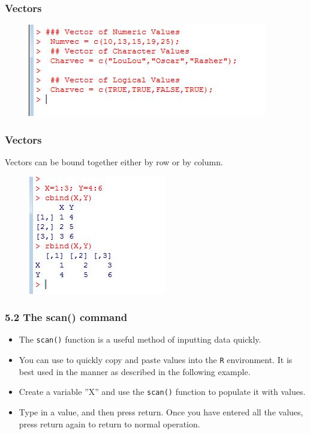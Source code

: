 \documentclass{beamer}
\begin{document}
 	\begin{frame}
 		\frametitle{Vectors}
 		\begin{figure}
 			\centering
 			\includegraphics[width=0.7\linewidth]{images/makevectors}
 			\caption{}
 			\label{fig:makevectors}
 		\end{figure}
 		
 	\end{frame}
 	\begin{frame}
 		\frametitle{Vectors} 
 		Vectors can be bound together either by row or by column.
 		\begin{figure}
 			\centering
 			\includegraphics[width=0.7\linewidth]{images/cbindrbind}
 		\end{figure}
 		
 	\end{frame}
 	\begin{frame}
 		\frametitle{5.2 The scan() command}
 		\begin{itemize}
 			\item The \texttt{scan()} function is a useful method of inputting data quickly. 
 			\item You can use to quickly copy
 			and paste values into the \texttt{R} environment. It is best used in the manner as described in the
 			following example. 
 			\item Create a variable ”X” and use the \texttt{scan()} function to populate it with
 			values. 
 			\item Type in a value, and then press return. Once you have entered all the values, press
 			return again to return to normal operation.
 		\end{itemize}
 	\end{frame}
\end{document}
